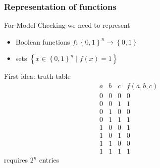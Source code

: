 \documentclass{beamer}
\begin{document}
\begin{frame}
  \frametitle{Representation of functions}
  For Model Checking we need to represent
  \begin{itemize}
  \item Boolean functions $f : \left\{0, 1\right\}^n \rightarrow \left\{0, 1\right\}$
  \item sets $\left\{x \in \left\{0, 1\right\}^n \;|\; f(x) = 1\right\}$
  \end{itemize}
  \pause
  First idea: truth table
  $$
  \begin{array}{ccc|c}
    a & b & c & f(a, b, c) \\
    \hline
    0 & 0 & 0 & 0 \\
    0 & 0 & 1 & 1 \\
    0 & 1 & 0 & 0 \\
    0 & 1 & 1 & 1 \\
    1 & 0 & 0 & 1 \\
    1 & 0 & 1 & 0 \\
    1 & 1 & 0 & 0 \\
    1 & 1 & 1 & 1
  \end{array}
  $$
  \pause
  \alert{requires $2^n$ entries}
\end{frame}
\end{document}
